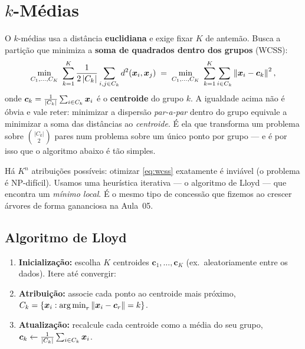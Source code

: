 \documentclass[11pt,a4paper]{article}
\begin{document}
\section{$k$-Médias}
O $k$-médias usa a distância \textbf{euclidiana} e exige fixar $K$ de antemão. Busca
a partição que minimiza a \textbf{soma de quadrados dentro dos grupos} (WCSS):
\begin{equation}\label{eq:wcss}
  \min_{C_1,\dots,C_K}\ \sum_{k=1}^{K} \frac{1}{2\left\lvert C_k \right\rvert}
     \sum_{i,j\in C_k} d^2(\bm{x}_i,\bm{x}_j)
  \;=\; \min_{C_1,\dots,C_K}\ \sum_{k=1}^{K}\sum_{i\in C_k}\left\lVert \bm{x}_i-\bm{c}_k \right\rVert^2,
\end{equation}
onde $\bm{c}_k=\frac{1}{\left\lvert C_k \right\rvert}\sum_{i\in C_k}\bm{x}_i$ é o \textbf{centroide} do
grupo $k$. A igualdade acima não é óbvia e vale reter: minimizar a dispersão
\emph{par-a-par} dentro do grupo equivale a minimizar a soma das distâncias ao
\emph{centroide}. É ela que transforma um problema sobre $\binom{|C_k|}{2}$ pares
num problema sobre um único ponto por grupo --- e é por isso que o algoritmo abaixo
é tão simples.

\begin{atencao}
Há $K^n$ atribuições possíveis: otimizar \eqref{eq:wcss} exatamente é inviável (o
problema é NP-difícil). Usamos uma heurística iterativa --- o algoritmo de Lloyd ---
que encontra um \emph{mínimo local}. É o mesmo tipo de concessão que fizemos ao
crescer árvores de forma gananciosa na Aula~05.
\end{atencao}

\subsection{Algoritmo de Lloyd}
\begin{tcolorbox}[colback=cinzaclaro,colframe=azulufrj,title={Algoritmo de Lloyd ($k$-médias)}]
\begin{enumerate}[leftmargin=1.4cm,nosep]
  \item \textbf{Inicialização:} escolha $K$ centroides $\bm{c}_1,\dots,\bm{c}_K$
        (ex.\ aleatoriamente entre os dados). Itere até convergir:
  \item \textbf{Atribuição:} associe cada ponto ao centroide mais próximo,
        $C_k=\{\x_i:\argmin_r \norm{\x_i-\bm{c}_r}=k\}$.
  \item \textbf{Atualização:} recalcule cada centroide como a média do seu grupo,
        $\bm{c}_k\leftarrow \frac{1}{\left\lvert C_k \right\rvert}\sum_{i\in C_k}\bm{x}_i$.
\end{enumerate}
\end{tcolorbox}
\end{document}
